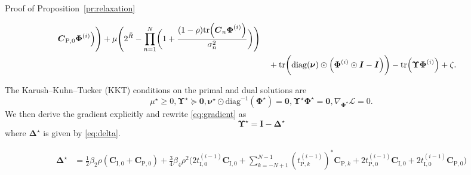 \documentclass[journal]{IEEEtran}
\begin{document}
\begin{appendix}
\begin{subsection}{Proof of Proposition~\ref{pr:relaxation}}
\begin{figure*}[!b]
\begin{align}
							\boldsymbol{C}_{\mathrm{P},0} \boldsymbol{\Phi}^{(i)}
						\Bigr)
						\Biggr) + \mu \Biggl(
						2^{\bar{R}} - \prod_{n=1}^N \biggl(
							1 + \frac{(1-\rho) \mathrm{tr}\Bigl(
								\boldsymbol{C}_n \boldsymbol{\Phi}^{(i)}
							\Bigr)}{\sigma_n^2}
						\biggr)
					\Biggr)\nonumber\\
					& \quad + \mathrm{tr}\biggl(
						\mathrm{diag}(\boldsymbol{\nu}) \odot \Bigl(
							\boldsymbol{\Phi}^{(i)} \odot \boldsymbol{I} - \boldsymbol{I}
						\Bigr)
					\biggr) - \mathrm{tr} \Bigl(
						\boldsymbol{\Upsilon} \boldsymbol{\Phi}^{(i)}
					\Bigr) + \zeta.
				\end{align}
			\end{figure*}
			The Karush–Kuhn–Tucker (KKT) conditions on the primal and dual solutions are
			\begin{subequations}
				\begin{equation}\label{eq:lagrange_multiplier}
					\mu^\star \ge 0, \boldsymbol{\Upsilon}^\star \succeq \boldsymbol{0},
				\end{equation}
				\begin{equation}\label{eq:complementary_slackness}
					\boldsymbol{\nu}^\star \odot \mathrm{diag}^{-1}(\boldsymbol{\Phi}^\star) = \boldsymbol{0}, \boldsymbol{\Upsilon}^\star \boldsymbol{\Phi}^\star = \boldsymbol{0},
				\end{equation}
				\begin{equation}\label{eq:gradient}
					\nabla_{\boldsymbol{\Phi}^\star} \mathcal{L} = 0.
				\end{equation}
			\end{subequations}
			We then derive the gradient explicitly and rewrite \eqref{eq:gradient} as
			\begin{equation}
				\boldsymbol{\Upsilon}^\star = \boldsymbol{I} - \boldsymbol{\Delta}^\star
			\end{equation}
			where $\boldsymbol{\Delta}^\star$ is given by \eqref{eq:delta}.
			\begin{figure*}[!b]
				\begin{align}\label{eq:delta}
					\boldsymbol{\Delta}^\star
					& = \frac{1}{2} \beta_2 \rho (\boldsymbol{C}_{\mathrm{I},0}+\boldsymbol{C}_{\mathrm{P},0}) + \frac{3}{4} \beta_4 \rho^2
						\Biggl(
							2 t_{\mathrm{I},0}^{(i-1)} \boldsymbol{C}_{\mathrm{I},0} + \sum_{k=-N+1}^{N-1} (t_{\mathrm{P},k}^{(i-1)})^* \boldsymbol{C}_{\mathrm{P},k} + 2 t_{\mathrm{P},0}^{(i-1)} \boldsymbol{C}_{\mathrm{I},0} + 2 t_{\mathrm{I},0}^{(i-1)} \boldsymbol{C}_{\mathrm{P},0}
						\Biggr)\nonumber\\

\end{align}
\end{figure*}
\end{subsection}
\end{appendix}
\end{document}
